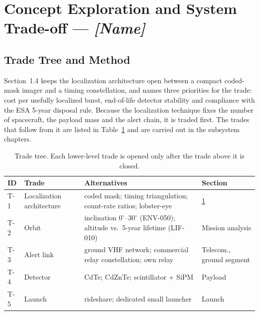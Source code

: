 
\section{Concept Exploration and System Trade-off --- \textit{[Name]}}\label{sec:tradeoff}

\subsection{Trade Tree and Method}

Section~1.4 keeps the localization architecture open between a compact coded-mask
imager and a timing constellation, and names three priorities for the trade: cost per
usefully localized burst, end-of-life detector stability and compliance with the ESA
5-year disposal rule. Because the localization technique fixes the number of spacecraft,
the payload mass and the alert chain, it is traded first. The trades that follow from it
are listed in Table~\ref{tab:tradetree} and are carried out in the subsystem chapters.

\begin{table}[htbp]\centering\small
\caption{Trade tree. Each lower-level trade is opened only after the trade above it is closed.}\label{tab:tradetree}
\begin{tabularx}{\linewidth}{@{}l X X l@{}}\toprule
ID & Trade & Alternatives & Section \\\midrule
T-1 & Localization architecture & coded mask; timing triangulation; count-rate ratios; lobster-eye & \ref{sec:tradeoff} \\
T-2 & Orbit & inclination $0^\circ$--$30^\circ$ (ENV-050); altitude vs.\ 5-year lifetime (LIF-010) & Mission analysis \\
T-3 & Alert link & ground VHF network; commercial relay constellation; own relay & Telecom., ground segment \\
T-4 & Detector & CdTe; CdZnTe; scintillator + SiPM & Payload \\
T-5 & Launch & rideshare; dedicated small launcher & Launch \\\bottomrule
\end{tabularx}\end{table}

